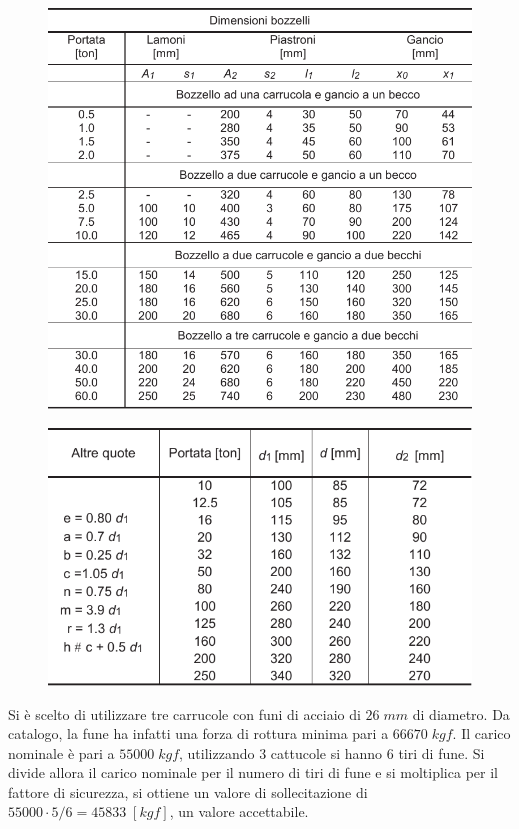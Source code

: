 \begin{figure}[H]
\centering
\begin{minipage}{.5\textwidth}
  \centering
  \includegraphics[width=.7\linewidth]{imgs/DimGen.pdf}
  \label{fig:DimGen0}
\end{minipage}%
\begin{minipage}{.5\textwidth}
  \centering
  \includegraphics[width=.9\linewidth]{imgs/DimGen2.pdf}
  \label{fig:DimGen2}
\end{minipage}
\end{figure}
Si è scelto di utilizzare tre carrucole con funi di acciaio di $26 \; mm$ di diametro. Da catalogo, la fune ha infatti una forza di rottura minima pari a $66670 \; kgf$. Il carico nominale è pari a $55000\;kgf$, utilizzando 3 cattucole si hanno 6 tiri di fune. Si divide allora il carico nominale per il numero di tiri di fune e si moltiplica per il fattore di sicurezza, si ottiene un valore di sollecitazione di $55000 \cdot 5/6 = 45833\; [kgf]$, un valore accettabile. 

